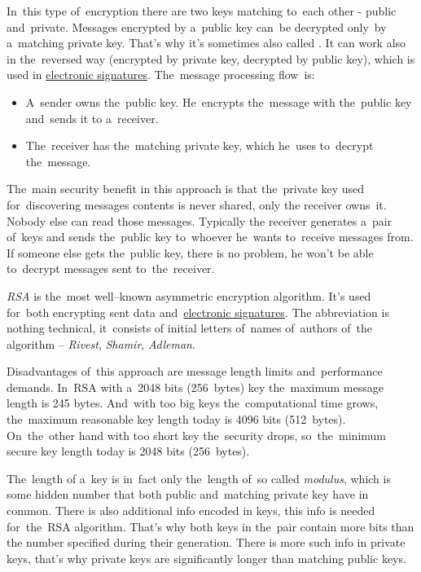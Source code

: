 \label{asymmetriccryptography}
In~this type of~encryption there are two keys matching to~each other - public and~private.
Messages encrypted by a~public key can~be decrypted only~by a~matching private key.
That's why it's sometimes also called .
It can work also in the~reversed way (encrypted by private key, decrypted by public key), which is used in \hyperref[electronicsignature]{electronic signatures}.
The~message processing flow~is:
\begin{itemize}
    \item A~sender owns the~public key.
          He~encrypts the~message with the~public key and~sends it to a~receiver.
    \item The~receiver has the~matching private key, which he~uses to~decrypt the~message.
\end{itemize}

\noindent The~main security benefit in this approach is that the~private key used for~discovering messages contents is never shared, only the receiver owns~it.
Nobody else can read those messages.
Typically the receiver generates a~pair of~keys and sends the~public key to~whoever he~wants to~receive messages from.
If someone else gets the~public key, there is no problem, he won't be able to~decrypt messages sent to~the~receiver.

\label{rsa}
\textit{RSA} is the~most well--known asymmetric encryption algorithm.
It's used for~both encrypting sent data and~\hyperref[electronicsignature]{electronic signatures}.
The abbreviation is nothing technical, it~consists of initial letters of~names of~authors of~the algorithm -- \textit{Rivest}, \textit{Shamir}, \textit{Adleman}.

Disadvantages of~this approach are message length limits and~performance demands.
In~RSA with a~2048 bits (256~bytes) key the~maximum message length is 245 bytes.
And~with too big keys the~computational time grows, the~maximum reasonable key length today is 4096 bits (512~bytes).
On~the~other hand with too short key the~security drops, so~the~minimum secure key length today is 2048 bits (256~bytes).

The~length of a~key is in~fact only the~length of~so called \textit{modulus}, which is some hidden number that both public and~matching private key have in common.
There is also additional info encoded in keys, this info is needed for~the~RSA algorithm.
That's why both keys in the~pair contain more bits than the number specified during their generation.
There is more such info in private keys, that's why private keys are significantly longer than matching public keys.

